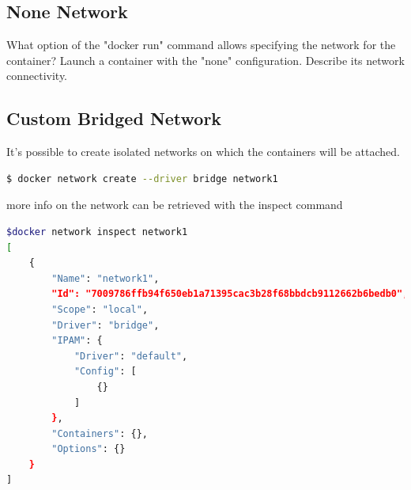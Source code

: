 \documentclass[a4paper,11pt]{exam}
\begin{document}
\begin{questions}
\end{questions}

\subsection{None Network}
\begin{questions}
	\question What option of the "docker run" command allows specifying the network for the container? 
	\question Launch a container with the "none" configuration. Describe its network connectivity.
\end{questions}


\subsection{Custom Bridged Network}


It's possible to create isolated networks on which the containers will be attached.
\begin{lstlisting}[frame=single,language={sh}]
$ docker network create --driver bridge network1
\end{lstlisting}

more info on the network can be retrieved with the inspect command

\begin{lstlisting}[frame=single,language={sh}]
$docker network inspect network1
[
    {
        "Name": "network1",
        "Id": "7009786ffb94f650eb1a71395cac3b28f68bbdcb9112662b6bedb0",
        "Scope": "local",
        "Driver": "bridge",
        "IPAM": {
            "Driver": "default",
            "Config": [
                {}
            ]
        },
        "Containers": {},
        "Options": {}
    }
]
\end{lstlisting}
\end{document}
